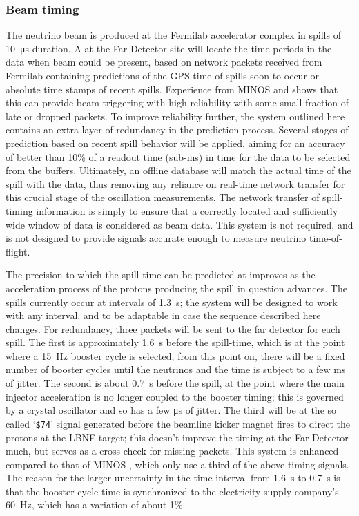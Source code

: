 

\subsubsection{Beam timing}
\label{sec:fd-daq-design-beamtiming}

The neutrino beam is produced at the Fermilab accelerator complex in
spills of \SI{10}{\us} duration. 
A  at the Far Detector site will locate the time periods in
the data when beam could be present, based on network packets received
from Fermilab containing predictions of the GPS-time of spills soon to
occur or absolute time stamps of recent spills. %
Experience from MINOS and \nova shows that this can provide beam
triggering with high reliability with some small fraction of late or
dropped packets.
To improve reliability further, the system outlined here contains an extra layer
of redundancy in the prediction process. 
Several stages of prediction based on recent spill behavior will be applied, aiming
for an accuracy of better than 10\% of a readout
time (sub-\si{\ms}) in time for the data to be selected from
the  buffers. 
Ultimately, an offline database will match the actual time of the
spill with the data, thus removing any reliance on real-time network
transfer for this crucial stage of the oscillation measurements. The
network transfer of spill-timing information is simply to ensure that a
correctly located and sufficiently wide window of data is considered
as beam data. This system is not required, and is not designed to
provide signals accurate enough to measure neutrino time-of-flight.

The precision to which the spill time can be predicted at \fnal
improves as the acceleration process of the protons producing the
spill in question advances.  The spills currently occur at intervals
of \SI{1.3}{\s}; the system will be designed to work with any interval, and
to be adaptable in case the sequence described here changes.  For
redundancy, three packets will be sent to the far detector for each
spill.  The first is approximately \SI{1.6}{\s} before the spill-time, which
is at the point where a \SI{15}{\Hz} booster cycle is selected; from this
point on, there will be a fixed number of booster cycles until the
neutrinos and the time is subject to a few ms of jitter.  The second
is about \SI{0.7}{\s} before the spill, at the point where the main injector
acceleration is no longer coupled to the booster timing; this is
governed by a crystal oscillator and so has a few \si{\us} of jitter.
The third will be at the so called `\texttt{\$74}' signal generated before the beamline kicker magnet fires
to direct the protons at the LBNF target; this doesn't improve the
timing at the Far Detector much, but serves as a cross check for
missing packets.  This system is enhanced compared to that of
MINOS-\nova, which only use a third of the above timing signals.  The
reason for the larger uncertainty in the time interval from \SI{1.6}{\s} to
\SI{0.7}{\s} is that the booster cycle time is synchronized to the
electricity supply company's \SI{60}{\Hz}, which has a variation of about
1\%.

